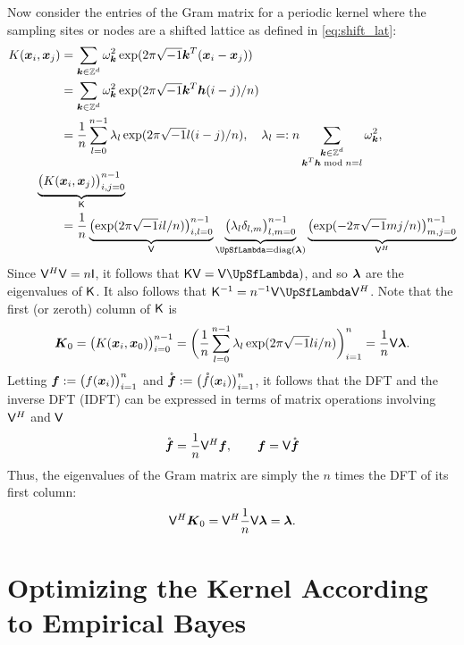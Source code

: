 \documentclass{amsart}
\newcommand{\rvf}{\mathring{\vf}}
\begin{document}
Now consider the entries of the Gram matrix for a periodic kernel where the sampling sites or nodes are a shifted lattice as defined in \eqref{eq:shift_lat}:
\begin{align*}
    K(\vx_i,\vx_j)  &= \sum_{\vk \in \integers^d} \omega_{\vk}^2 \exp(2 \pi \sqrt{-1} \vk^T(\vx_i - \vx_j)) \\
    & = \sum_{\vk \in \integers^d} \omega_{\vk}^2 \exp(2 \pi \sqrt{-1} \vk^T \vh (i-j)/n) \\
    & = \frac 1n \sum_{l = 0}^{n-1} \lambda_l \exp(2 \pi \sqrt{-1} l (i-j)/n), \quad \lambda_l =: n\sum_{\substack{\vk \in \integers^d \\ \vk^T\vh \bmod n = l}} \omega_{\vk}^2, \\
    \MoveEqLeft \underbrace{\bigl ( K(\vx_i,\vx_j)\bigr)_{i,j = 0}^{n-1}}_{\mK} \\
    &
    = \frac 1n \underbrace{\bigl ( \exp(2 \pi \sqrt{-1} il/n) \bigr)_{i,l = 0}^{n-1}}_{\mV} 
    \underbrace{\bigl ( \lambda_l \delta_{l,m} \bigr)_{l,m = 0}^{n-1}}_{\mLambda = \diag(\vlambda)} 
    \underbrace{\bigl ( \exp(- 2 \pi \sqrt{-1} mj/n) \bigr)_{m,j = 0}^{n-1}}_{\mV^H}
\end{align*}
Since $\mathsf{V}^H \mathsf{V} = n \mathsf{I}$, it follows that $\mK \mV  =\mV \mLambda)$, and so $\boldsymbol{\lambda}$ are the eigenvalues of $\mathsf{K}$.  It also follows that $\mK^{-1} = n^{-1} \mV \mLambda \mV^H$.  Note that the first (or zeroth) column of $\mathsf{K}$ is 
\begin{equation*}
    \boldsymbol{K}_0 = \bigl ( K(\boldsymbol{x}_i,\boldsymbol{x}_0)\bigr)_{i = 0}^{n-1}
    = \biggl( \frac 1n \sum_{l = 0}^{n-1} \lambda_l \exp(2 \pi \sqrt{-1} l i/n)\biggr)_{i=1}^n = \frac 1n \mathsf{V} \boldsymbol{\lambda}.
\end{equation*}
Letting $\boldsymbol{f} := \bigl( f(\boldsymbol{x}_i) \bigr)_{i=1}^n$ and $\rvf := \bigl( \rf(\vx_i) \bigr)_{i=1}^n$, it follows that the DFT and the inverse DFT (IDFT) can be expressed in terms of matrix operations involving $\mathsf{V}^H$ and $\mathsf{V}$
\begin{equation}
    \rvf = \frac 1n \mV^H \vf, \qquad \vf = \mV \rvf
\end{equation}
Thus, the eigenvalues of the Gram matrix are simply the $n$ times the DFT of its first column:
\begin{equation*}
    \mathsf{V}^{H} \boldsymbol{K}_0 = \mathsf{V}^{H} \frac 1n \mathsf{V} \boldsymbol{\lambda} = \boldsymbol{\lambda}.
\end{equation*}

\section{Optimizing the Kernel According to Empirical Bayes}
\end{document}
